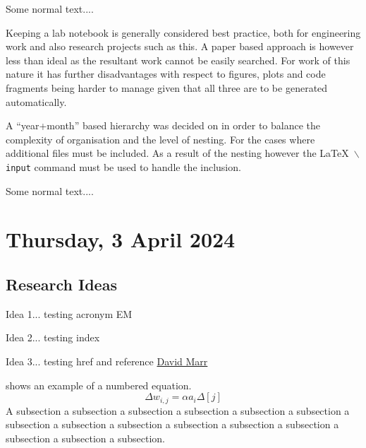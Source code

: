 Some normal text....

\begin{slantnote}
  Keeping a lab notebook is generally considered best practice, both for
  engineering work and also research projects such as this. A paper based
  approach is however less than ideal as the resultant work cannot be
  easily searched. For work of this nature it has further disadvantages
  with respect to figures, plots and code fragments being harder to manage
  given that all three are to be generated automatically.

  A ``year+month'' based hierarchy was decided on in order to balance the
  complexity of organisation and the level of nesting. For the cases where
  additional files must be included. As a result of the nesting however the
  \LaTeX\ \texttt{$\backslash$input} command must be used to handle the
  inclusion.
\end{slantnote}

Some normal text....

\pendsign

\section[2024/04/04]{Thursday, 3 April 2024}

\subsection{Research Ideas}

\begin{compactitem}
\item Idea 1... testing acronym \ac{EM}
\item Idea 2... testing index 
\item Idea 3... testing href and reference
\href{http://en.wikipedia.org/wiki/David_Marr_(neuroscientist)}{David Marr}
~\cite{marr_aa_2010}
\end{compactitem}


 shows an example of a numbered equation.
\begin{equation}
  \Delta w_{i,j} = \alpha a_i \Delta[j]  \label{eqn:example}
\end{equation}
A subsection a subsection a subsection a subsection a subsection a
subsection a subsection a subsection a subsection a subsection a
subsection a subsection a subsection a subsection a subsection.
\nocite{dellaert_spieits_1997}

